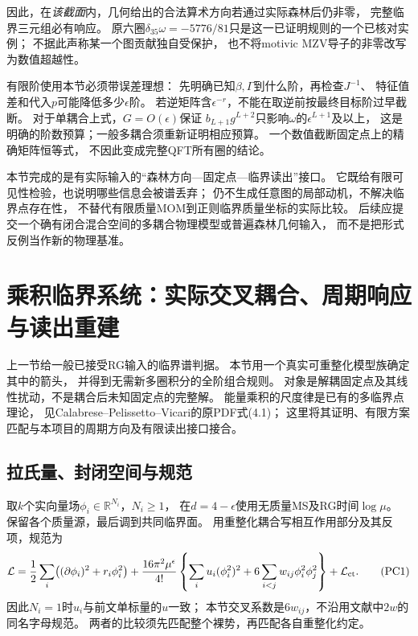 \documentclass[11pt,a4paper]{ctexart}
\theoremstyle{cnplain}\newtheorem{theorem}{定理}[section]
\theoremstyle{definition}\newtheorem{definition}[theorem]{定义}
\theoremstyle{remark}\newtheorem{remark}[theorem]{注}
\begin{document}
因此，在\emph{该截面}内，几何给出的合法算术方向若通过实际森林后仍非零，
完整临界三元组必有响应。
原六圈$\delta_{35}\omega=-5776/81$只是这一已证明规则的一个已核对实例；
不据此声称某一个图贡献独自受保护，
也不将motivic MZV导子的非零改写为数值超越性。

有限阶使用本节必须带误差理想：
先明确已知$\beta,\Gamma$到什么阶，再检查$J^{-1}$、
特征值差和代入$p$可能降低多少$\epsilon$阶。
若逆矩阵含$\epsilon^{-r}$，不能在取逆前按最终目标阶过早截断。
对于单耦合上式，$G=O(\epsilon)$保证
$b_{L+1}g^{L+2}$只影响$\omega$的$\epsilon^{L+1}$及以上，
这是明确的阶数预算；一般多耦合须重新证明相应预算。
一个数值截断固定点上的精确矩阵恒等式，
不因此变成完整QFT所有圈的结论。

本节完成的是有实际输入的“森林方向---固定点---临界读出”接口。
它既给有限可见性检验，也说明哪些信息会被谱丢弃；
仍不生成任意图的局部动机，不解决临界点存在性，
不替代有限质量MOM到正则临界质量坐标的实际比较。
后续应提交一个确有闭合混合空间的多耦合物理模型或普遍森林几何输入，
而不是把形式反例当作新的物理基准。




\section{乘积临界系统：实际交叉耦合、周期响应与读出重建}\label{sec:productcritical}

上一节给一般已接受RG输入的临界谱判据。
本节用一个真实可重整化模型族确定其中的箭头，
并得到无需新多圈积分的全阶组合规则。
对象是解耦固定点及其线性扰动，不是耦合后未知固定点的完整解。
能量乘积的尺度律是已有的多临界点理论，
见Calabrese--Pelissetto--Vicari的原PDF式(4.1)\cite{CPVprod}；
这里将其证明、有限方案匹配与本项目的周期方向及有限读出接口接合。

\subsection{拉氏量、封闭空间与规范}

取$k$个实向量场$\phi_i\in\mathbb R^{N_i}$，$N_i\geq1$，
在$d=4-\epsilon$使用无质量MS及RG时间$\log\mu$。
保留各个质量源，最后调到共同临界面。
用重整化耦合写相互作用部分及其反项，规范为
\[
 {\cal L}=\frac12\sum_i\bigl((\partial\phi_i)^2+r_i\phi_i^2\bigr)
 +\frac{16\pi^2\mu^\epsilon}{4!}
 \left\{\sum_i u_i(\phi_i^2)^2+
             6\sum_{i<j}w_{ij}\phi_i^2\phi_j^2\right\}
 +{\cal L}_{\rm ct}.                                      \tag{PC1}\label{eq:productlag}
\]
因此$N_i=1$时$u_i$与前文单标量的$u$一致；
本节交叉系数是$6w_{ij}$，不沿用文献中$2w$的同名字母规范。
两者的比较须先匹配整个裸势，再匹配各自重整化约定。
\end{document}
